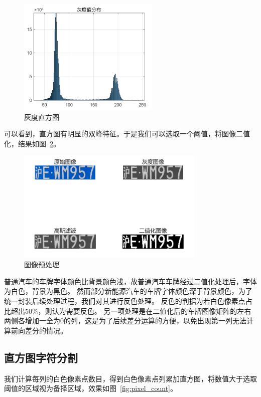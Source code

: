 \documentclass[utf8,a4paper]{ctexart}
\begin{document}
\begin{figure}[h]
    \centering
    \includegraphics[width=0.6\textwidth]{./img/easy/灰度阈值可视化.png}
    \caption{灰度直方图}
    \label{fig:hist}
\end{figure}

可以看到，直方图有明显的双峰特征。于是我们可以选取一个阈值，将图像二值化，结果如图~\ref{fig:preprocess}。

\begin{figure}[h]
    \centering
    \includegraphics[width=0.8\textwidth]{./img/easy/处理效果可视化.png}
    \caption{图像预处理}
    \label{fig:preprocess}
\end{figure}

普通汽车的车牌字体颜色比背景颜色浅，故普通汽车车牌经过二值化处理后，字体为白色，背景为黑色。
然而部分新能源汽车的车牌字体颜色深于背景颜色，为了统一封装后续处理过程，我们对其进行反色处理。
反色的判据为若白色像素点占比超出$50\%$，则认为需要反色。
另一项处理是在二值化后的车牌图像矩阵的左右两侧各增加一全为$0$的列，这是为了后续差分运算的方便，以免出现第一列无法计算前向差分的情况。

\subsection{直方图字符分割}
我们计算每列的白色像素点数目，得到白色像素点列累加直方图，将数值大于选取阈值的区域视为备择区域，效果如图~\ref{fig:pixel_count}。
\end{document}
